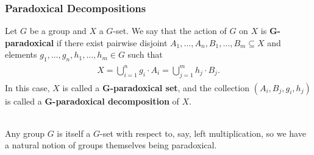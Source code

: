 \documentclass{beamer}
\begin{document}
\begin{frame}
\frametitle{Paradoxical Decompositions}
\begin{definition}
Let $G$ be a group and $X$ a $G$-set. We say that the action of $G$ on $X$ is \textbf{$\boldsymbol{G}$-paradoxical} if there exist pairwise disjoint $A_1, \dots, A_n, B_1, \dots, B_m \subseteq X$ and elements $g_1, \dots, g_n, h_1, \dots, h_m \in G$ such that\\[-1.5\baselineskip]
\begin{align*}
\begin{split}
X = \bigcup_{i=1}^n g_i \cdot A_i = \bigcup_{j=1}^m h_j \cdot B_j.
\end{split}
\end{align*}
In this case, $X$ is called a \textbf{$\boldsymbol{G}$-paradoxical set}, and the collection $(A_i, B_j, g_i, h_j)$ is called a \textbf{$\boldsymbol{G}$-paradoxical decomposition} of $X$.
\end{definition}

\noindent\\[0.5\baselineskip] Any group $G$ is itself a $G$-set with respect to, say, left multiplication, so we have a natural notion of groups themselves being paradoxical.\\[\baselineskip]


\end{frame}

\end{document}
